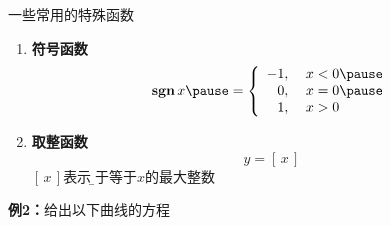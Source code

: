 \begin{frame}{一些常用的特殊函数}
	\linespread{1.2}\pause 
	\begin{enumerate}
	  \item {\bf 符号函数}\pause \\
	  $$\bm{\mathrm{sgn}}\,x\pause =\left\{
		\begin{array}{rl}
		-1,\;&x<0\pause \\
		0,\;&x=0\pause \\
		1,\;&x>0
		\end{array}
	  \right.$$\pause 
	  \item {\bf 取整函数}\pause \\
	  $$y=\left[ \,x\, \right]$$\pause 
	  $[\,x\,]$表示{\b 小于等于$x$的最大整数}
	\end{enumerate}
\end{frame}

\begin{frame}
	\linespread{1.3}
	\begin{exampleblock}{{\bf 例2：}给出以下曲线的方程}\pause
		\begin{center}
			\\
			\pause
			\\
			\pause
		\end{center}
	\end{exampleblock}
\end{frame}

